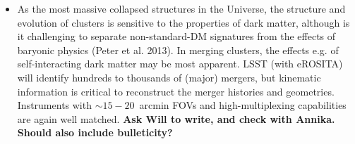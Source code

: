 \begin{itemize}
\item As the most massive collapsed structures in the Universe, the structure and evolution of clusters is sensitive to the properties of dark matter, although is it challenging to separate non-standard-DM signatures from the effects of baryonic physics (Peter et al. 2013). In merging clusters, the effects e.g. of self-interacting dark matter may be most apparent.  LSST (with eROSITA) will identify hundreds to thousands of (major) mergers, but kinematic information is critical to reconstruct the merger histories and geometries. Instruments with $\sim 15-20$~arcmin FOVs and high-multiplexing capabilities are again well matched. {\bf Ask Will to write, and check with Annika.  Should also include bulleticity?}
\end{itemize}

%
%
